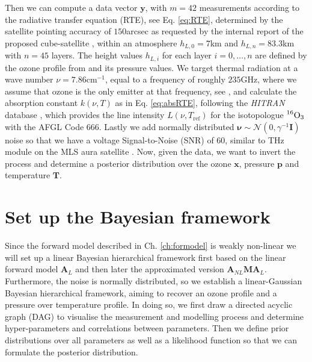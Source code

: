 Then we can compute a data vector $\bm{y}$, with $m = 42$ measurements according to the radiative transfer equation (RTE), see Eq. \ref{eq:RTE}, determined by the satellite pointing accuracy of $150$arcsec as requested by the internal report of the proposed cube-satellite \cite{CubeSatInternal}, within an atmosphere $h_{L,0}=7$km and $h_{L,n} = 83.3$km with $n = 45$ layers.
The height values $h_{L,i}$ for each layer $i = 0,\dots, n$ are defined by the ozone profile from \cite{MLSdata} and its pressure values.
We target thermal radiation at a wave number $\nu = 7.86\text{cm}^{-1}$, equal to a frequency of roughly $235$GHz, where we assume that ozone is the only emitter at that frequency, see \cite{}, and calculate the absorption constant $k(\nu,T)$ as in Eq. \ref{eq:absRTE}, following the \textit{HITRAN} database \cite{gordon2022hitran2020}, which provides the line intensity $L(\nu,T_{\text{ref}})$ for the isotopologue $\prescript{16}{}{\text{O}}_3$ with the AFGL Code 666.
Lastly we add normally distributed $\bm{\nu} \sim \mathcal{N}(0,\gamma^{-1} \bm{I})$ noise so that we have a voltage Signal-to-Noise (SNR) of $60$, similar to THz module on the MLS aura satellite \cite{pickett2006snr}.
Now, given the data, we want to invert the process and determine a posterior distribution over the ozone $\bm{x}$, pressure $\bm{p}$ and temperature $\bm{T}$.

\section{Set up the Bayesian framework}
\label{sec:BayModel}
Since the forward model described in Ch. \ref{ch:formodel} is weakly non-linear we will set up a linear Bayesian hierarchical framework first based on the linear forward model $\bm{A}_L$ and then later the approximated version $\bm{A}_{NL}\bm{M} \bm{A}_L$.
Furthermore, the noise is normally distributed, so we establish a linear-Gaussian Bayesian hierarchical framework, aiming to recover an ozone profile and a pressure over temperature profile.
In doing so, we first draw a directed acyclic graph (DAG) to visualise the measurement and modelling process and determine hyper-parameters and correlations between parameters.
Then we define prior distributions over all parameters as well as a likelihood function so that we can formulate the posterior distribution.


